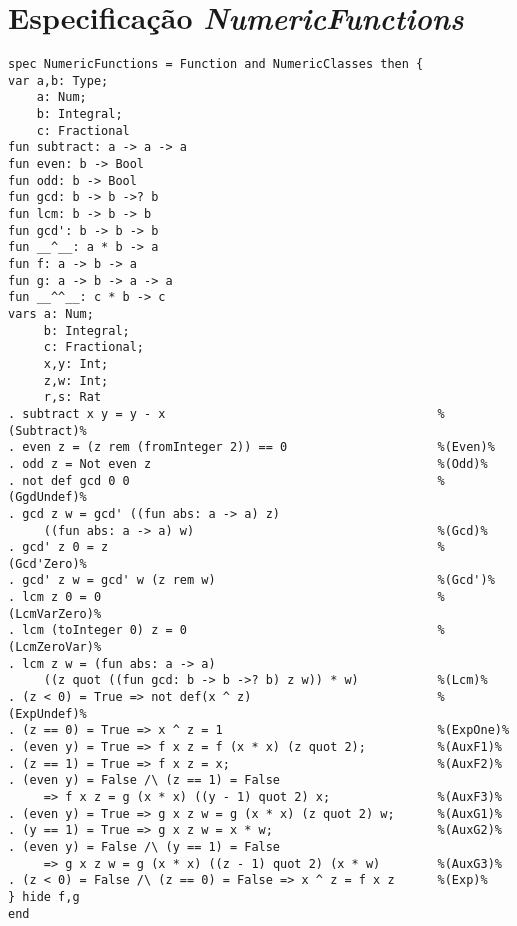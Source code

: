 \section{Especificação \textit{NumericFunctions}}
\label{appendix:strictSpec:numericFunctions}
\begin{Verbatim}
spec NumericFunctions = Function and NumericClasses then {
var a,b: Type;
    a: Num;
    b: Integral;
    c: Fractional
fun subtract: a -> a -> a
fun even: b -> Bool
fun odd: b -> Bool
fun gcd: b -> b ->? b
fun lcm: b -> b -> b
fun gcd': b -> b -> b
fun __^__: a * b -> a
fun f: a -> b -> a
fun g: a -> b -> a -> a
fun __^^__: c * b -> c
vars a: Num;
     b: Integral;
     c: Fractional;
     x,y: Int;
     z,w: Int;
     r,s: Rat
. subtract x y = y - x                                      %(Subtract)%
. even z = (z rem (fromInteger 2)) == 0                     %(Even)%
. odd z = Not even z                                        %(Odd)%
. not def gcd 0 0                                           %(GgdUndef)%
. gcd z w = gcd' ((fun abs: a -> a) z)
     ((fun abs: a -> a) w)                                  %(Gcd)%
. gcd' z 0 = z                                              %(Gcd'Zero)%
. gcd' z w = gcd' w (z rem w)                               %(Gcd')%
. lcm z 0 = 0                                               %(LcmVarZero)%
. lcm (toInteger 0) z = 0                                   %(LcmZeroVar)%
. lcm z w = (fun abs: a -> a)
     ((z quot ((fun gcd: b -> b ->? b) z w)) * w)           %(Lcm)%
. (z < 0) = True => not def(x ^ z)                          %(ExpUndef)%
. (z == 0) = True => x ^ z = 1                              %(ExpOne)%
. (even y) = True => f x z = f (x * x) (z quot 2);          %(AuxF1)%
. (z == 1) = True => f x z = x;                             %(AuxF2)%
. (even y) = False /\ (z == 1) = False
     => f x z = g (x * x) ((y - 1) quot 2) x;               %(AuxF3)%
. (even y) = True => g x z w = g (x * x) (z quot 2) w;      %(AuxG1)%
. (y == 1) = True => g x z w = x * w;                       %(AuxG2)%
. (even y) = False /\ (y == 1) = False
     => g x z w = g (x * x) ((z - 1) quot 2) (x * w)        %(AuxG3)%
. (z < 0) = False /\ (z == 0) = False => x ^ z = f x z      %(Exp)%
} hide f,g
end
\end{Verbatim}

